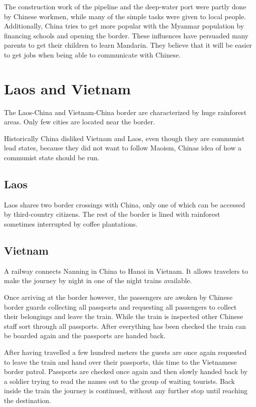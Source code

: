 \documentclass[conference]{IEEEtran}
\begin{document}
	The construction work of the pipeline and the deep-water port were partly done by Chinese workmen, while many of the simple tasks were given to local people. Additionally, China tries to get more popular with the Myanmar population by financing schools and opening the border. These influences have persuaded many parents to get their children to learn Mandarin. They believe that it will be easier to get jobs when being able to communicate with Chinese\cite{yt_oneVillageTwoCountriesNoBorderTheNewSilkRoadCNAInsider}.
	
	\section{Laos and Vietnam}
	The Laos-China and Vietnam-China border are characterized by huge rainforest areas. Only few cities are located near the border.
	
	Historically China disliked Vietnam and Laos, even though they are communist lead states, because they did not want to follow Maoism, Chinas idea of how a communist state should be run.
	
	\subsection{Laos}
	Laos shares two border crossings with China, only one of which can be accessed by third-country citizens. The rest of the border is lined with rainforest sometimes interrupted by coffee plantations.
	
	\subsection{Vietnam}
	A railway connects Nanning in China to Hanoi in Vietnam. It allows travelers to make the journey by night in one of the night trains available.
	
	Once arriving at the border however, the passengers are awoken by Chinese border guards collecting all passports and requesting all passengers to collect their belongings and leave the train. While the train is inspected other Chinese staff sort through all passports. After everything has been checked the train can be boarded again and the passports are handed back.
	
	After having travelled a few hundred meters the guests are once again requested to leave the train and hand over their passports, this time to the Vietnamese border patrol. Passports are checked once again and then slowly handed back by a soldier trying to read the names out to the group of waiting tourists. Back inside the train the journey is continued, without any further stop until reaching the destination.
	
\end{document}
